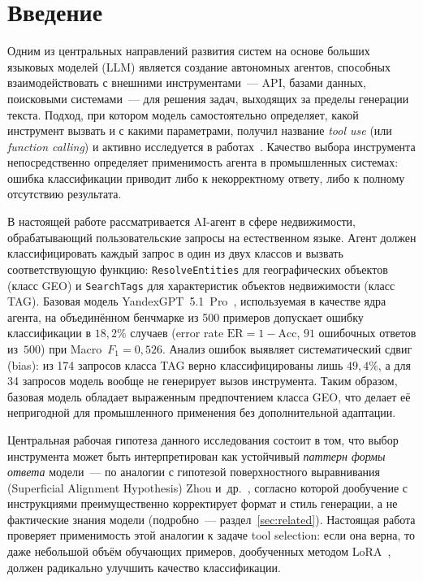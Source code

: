
\section{Введение}

Одним из центральных направлений развития систем на основе больших языковых моделей (LLM) является создание автономных агентов, способных взаимодействовать с внешними инструментами~--- API, базами данных, поисковыми системами~--- для решения задач, выходящих за пределы генерации текста. Подход, при котором модель самостоятельно определяет, какой инструмент вызвать и с какими параметрами, получил название \textit{tool use} (или \textit{function calling}) и активно исследуется в работах~\cite{schick2023toolformer, patil2023gorilla, qin2024toollearning}. Качество выбора инструмента непосредственно определяет применимость агента в промышленных системах: ошибка классификации приводит либо к некорректному ответу, либо к полному отсутствию результата.

В настоящей работе рассматривается AI-агент в сфере недвижимости, обрабатывающий пользовательские запросы на естественном языке. Агент должен классифицировать каждый запрос в один из двух классов и вызвать соответствующую функцию: \texttt{ResolveEntities} для географических объектов (класс GEO) и \texttt{SearchTags} для характеристик объектов недвижимости (класс TAG). Базовая модель YandexGPT~5.1~Pro~\cite{yandexgpt2024docs}, используемая в качестве ядра агента, на объединённом бенчмарке из 500 примеров допускает ошибку классификации в $18{,}2\%$ случаев (error rate $\mathrm{ER} = 1 - \mathrm{Acc}$, $91$ ошибочных ответов из~$500$) при Macro~$F_1 = 0{,}526$. Анализ ошибок выявляет систематический сдвиг (bias): из 174 запросов класса TAG верно классифицированы лишь $49{,}4\%$, а для 34 запросов модель вообще не генерирует вызов инструмента. Таким образом, базовая модель обладает выраженным предпочтением класса GEO, что делает её непригодной для промышленного применения без дополнительной адаптации.

Центральная рабочая гипотеза данного исследования состоит в том, что выбор инструмента может быть интерпретирован как устойчивый \textit{паттерн формы ответа} модели~--- по аналогии с гипотезой поверхностного выравнивания (Superficial Alignment Hypothesis) Zhou и~др.~\cite{zhou2023lima, gudibande2023false}, согласно которой дообучение с инструкциями преимущественно корректирует формат и стиль генерации, а не фактические знания модели (подробно~--- раздел~\ref{sec:related}). Настоящая работа проверяет применимость этой аналогии к задаче tool selection: если она верна, то даже небольшой объём обучающих примеров, дообученных методом LoRA~\cite{hu2022lora}, должен радикально улучшить качество классификации.

